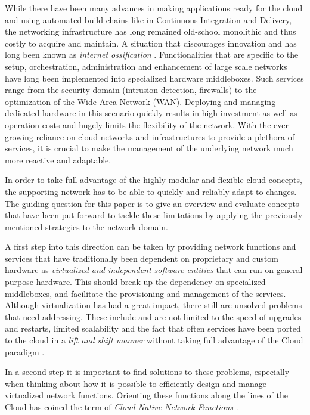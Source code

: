 While there have been many advances in making applications ready for the cloud  and using automated build chains like in Continuous Integration and Delivery,  the networking infrastructure has long remained old-school monolithic and thus costly to acquire and maintain. A situation that discourages innovation and has long been known as \textit{internet ossification} \cite{nunes2014survey}. Functionalities that are specific to the setup, orchestration, administration and enhancement of large scale networks have long been implemented into specialized hardware middleboxes. Such services range from the security domain (intrusion detection, firewalls) to the optimization of the Wide Area Network (WAN). Deploying and managing dedicated hardware in this scenario quickly results in high investment as well as operation costs and hugely limits the flexibility of the network. With the ever growing reliance on cloud networks and infrastructures to provide a plethora of services, it is crucial to make the management of the underlying network much more reactive and adaptable. 

In order to take full advantage of the highly modular and flexible cloud concepts, the supporting network has to be able to quickly and reliably adapt to changes. The guiding question for this paper is to give an overview and evaluate concepts that have been put forward to tackle these limitations by applying the previously mentioned strategies to the network domain.

A first step into this direction can be taken by providing network functions  and services that have traditionally been dependent on proprietary and custom hardware as \textit{virtualized and independent software entities} that can run on general-purpose hardware. This should break up the dependency on specialized middleboxes, and facilitate the provisioning and management of the services. Although virtualization has had a great impact, there still are unsolved problems that need addressing. These include and are not limited to the speed of upgrades and restarts, limited scalability and the fact that often services have been ported to the cloud in a \textit{lift and shift manner} without taking full advantage of the Cloud paradigm \cite{CNF}.

In a second step it is important to find solutions to these problems, especially when thinking about how it is possible to efficiently design and manage virtualized network functions. Orienting these functions along the lines of the Cloud has coined the term of \textit{Cloud Native Network Functions} \cite{CNF} \cite{inproceedings} \cite{evolutionnfv}. 

